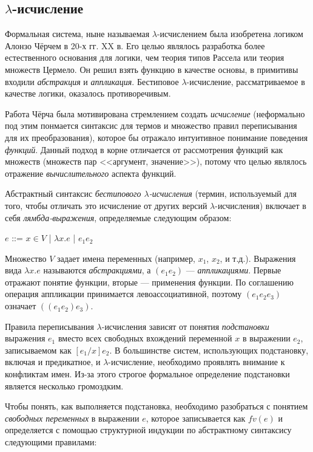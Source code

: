 \subsection{$\lambda$-исчисление}
\label{sec:lam}

Формальная система, ныне называемая $\lambda$-исчислением была изобретена логиком Алонзо Чёрчем в 20-х гг. XX в. Его целью являлось разработка более естественного основания для логики, чем теория типов Рассела или теория множеств Цермело. Он решил взять функцию в качестве основы, в примитивы входили \emph{абстракция} и \emph{аппликация}. Бестиповое $\lambda$-исчисление, рассматриваемое в качестве логики, оказалось противоречивым.

Работа Чёрча была мотивирована стремлением создать \emph{исчисление} (неформально под этим понмается синтаксис для термов и множество правил переписывания для их преобразования), которое бы отражало интуитивное понимание поведения \emph{функций}. Данный подход в корне отличается от рассмотрения функций как множеств (множеств пар <<аргумент, значение>>), потому что целью являлось отражение \emph{вычислительного} аспекта функций.

Абстрактный синтаксис \emph{бестипового $\lambda$-исчисления} (термин, используемый для того, чтобы отличать это исчисление от других версий $\lambda$-исчисления) включает в себя \emph{лямбда-выражения}, определяемые следующим образом:
\begin{center}
$e$ ::= $x \in V$ | $\lambda x. e$ | $e_1 e_2$
\end{center}

Множество $V$ задает имена переменных (например, $x_1$, $x_2$, и т.д.). Выражения вида $\lambda x. e$ называются \emph{абстракциями}, а $(e_1 e_2)$ --- \emph{аппликациями}. Первые отражают понятие функции, вторые --- применения функции. По соглашению операция аппликации принимается левоассоциативной, поэтому $(e_1 e_2 e_3)$ означает $((e_1 e_2) e_3)$.

Правила переписывания $\lambda$-исчисления зависят от понятия \emph{подстановки} выражения $e_1$ вместо всех свободных вхождений переменной $x$ в выражении $e_2$, записываемом как $[e_1/x]e_2$. В большинстве систем, использующих подстановку, включая и предикатное, и $\lambda$-исчисление, необходимо проявлять внимание к конфликтам имен. Из-за этого строгое формальное определение подстановки является несколько громоздким.

Чтобы понять, как выполняется подстановка, необходимо разобраться с понятием \emph{свободных переменных} в выражении $e$, которое записывается как $fv(e)$ и определяется с помощью структурной индукции по абстрактному синтаксису следующими правилами:

